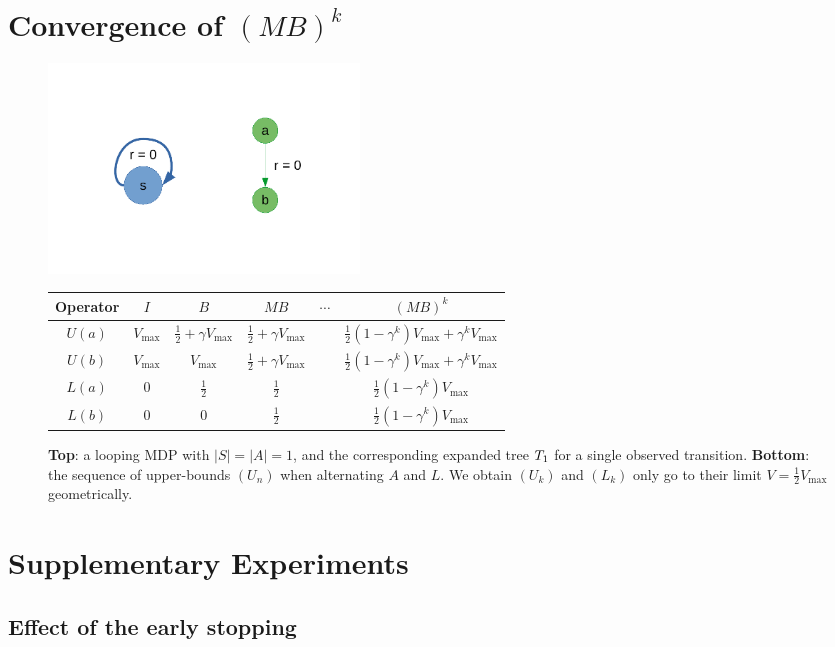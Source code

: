 \documentclass[runningheads]{llncs}
\begin{document}
\section{Convergence of $(M B)^k$}
\label{sec:convergence}
\begin{figure}[H]
    \centering
    \includegraphics[trim=2cm 2cm 2cm 2cm, clip, width=0.4\textwidth]{img/simple_loop.pdf}\\
    \begin{tabular}{cccccc}
         \toprule
         Operator & $I$ & $B$ & $M B$ & $\cdots$ & $(M B)^k$ \\
         \midrule
         $U(a)$ & $V_{\max}$ & $\frac{1}{2} + \gamma V_{\max}$ & $\frac{1}{2} + \gamma V_{\max}$ && $\frac{1}{2}(1-\gamma^k)V_{\max} + \gamma^k V_{\max}$\\
         $U(b)$ & $V_{\max}$ & $V_{\max}$ & $\frac{1}{2} + \gamma V_{\max}$ && $\frac{1}{2}(1-\gamma^k)V_{\max} + \gamma^k V_{\max}$\\
         $L(a)$ & $0$ & $\frac{1}{2}$ & $\frac{1}{2}$ && $\frac{1}{2}(1-\gamma^k)V_{\max}$\\
		 $L(b)$ & $0$ & $0$ & $\frac{1}{2}$ && $\frac{1}{2}(1-\gamma^k)V_{\max}$\\
         \bottomrule
    \end{tabular}
    \caption{\textbf{Top}: a looping MDP with $|S|=|A|=1$, and the corresponding expanded tree $T_1$ for a single observed transition. \textbf{Bottom}: the sequence of upper-bounds $(U_n)$ when alternating $A$ and $L$. We obtain $(U_k)$ and $(L_k)$ only go to their limit $V = \frac{1}{2}V_{\max}$ geometrically.} %
    \label{fig:simple_loop}
\end{figure}

\section{Supplementary Experiments}
\subsection{Effect of the early stopping}
\end{document}
